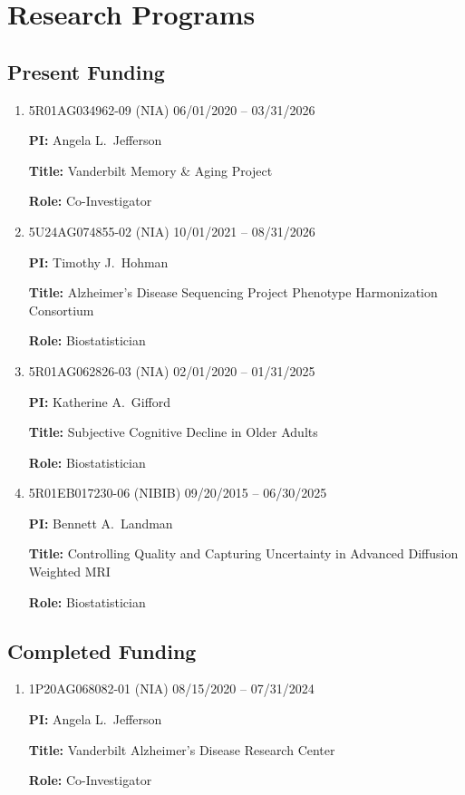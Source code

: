 \documentclass[12pt]{article}
\begin{document}
	
	\section*{Research Programs}
	\subsection*{Present Funding}
	\begin{enumerate}
		
		\item 5R01AG034962-09 (NIA) \hfill 06/01/2020 -- 03/31/2026
		
		{\bf PI:} Angela L.\ Jefferson
		
		{\bf Title:} Vanderbilt Memory \& Aging Project
		
		{\bf Role:} Co-Investigator
		\item 5U24AG074855-02 (NIA) \hfill 10/01/2021 -- 08/31/2026
		
		{\bf PI:} Timothy J.\ Hohman
		
		{\bf Title:} Alzheimer's Disease Sequencing Project Phenotype Harmonization Consortium
		
		{\bf Role:} Biostatistician
		\item 5R01AG062826-03 (NIA) \hfill 02/01/2020 -- 01/31/2025
		
		{\bf PI:} Katherine A.\ Gifford
		
		{\bf Title:} Subjective Cognitive Decline in Older Adults
		
		{\bf Role:} Biostatistician
		
		\item 5R01EB017230-06 (NIBIB) \hfill 09/20/2015 -- 06/30/2025
		
		{\bf PI:} Bennett A.\ Landman
		
		{\bf Title:} Controlling Quality and Capturing Uncertainty 
		in Advanced Diffusion Weighted MRI
		
		{\bf Role:} Biostatistician
	\end{enumerate}
	
	\subsection*{Completed Funding}
	\begin{enumerate}
		\item 1P20AG068082-01 (NIA) \hfill 08/15/2020 -- 
		07/31/2024
		
		{\bf PI:} Angela L.\ Jefferson
		
		{\bf Title:} Vanderbilt Alzheimer's Disease Research Center
		
		{\bf Role:} Co-Investigator
	\end{enumerate}
\end{document}
